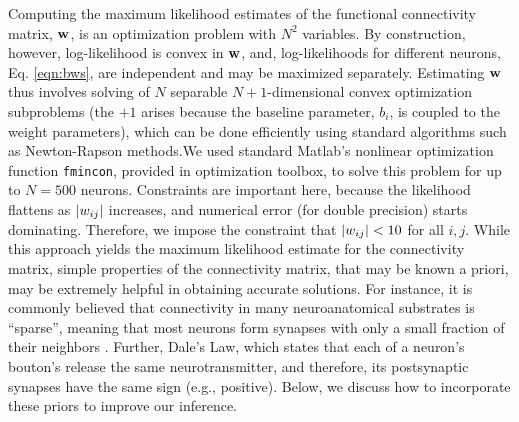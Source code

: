 


Computing the maximum likelihood estimates of the functional connectivity matrix, $\mathbf{w}$, is an optimization problem with $N^2$ variables. By construction, however, log-likelihood is convex in $\mathbf{w}$, and, log-likelihoods for different neurons, Eq. \eqref{eqn:bws}, are independent and may be maximized separately. Estimating $\mathbf{w}$ thus involves solving of $N$ separable $N+1$-dimensional convex optimization subproblems (the $+1$ arises because the baseline parameter, $b_i$, is coupled to the weight parameters), which can be done efficiently using standard algorithms such as Newton-Rapson methods.We used standard Matlab's nonlinear optimization function \texttt{fmincon}, provided in optimization toolbox, to solve this problem for up to $N=500$ neurons.  Constraints are important here, because the likelihood flattens as $|w_{ij}|$ increases, and numerical error (for double precision) starts dominating.  Therefore, we impose the constraint that $|w_{ij}|<10$ for all $i,j$. While this approach yields the maximum likelihood estimate for the connectivity matrix, simple properties of the connectivity matrix, that may be known a priori, may be extremely helpful in obtaining accurate solutions. For instance, it is commonly believed that connectivity in many neuroanatomical substrates is ``sparse'', meaning that most neurons form synapses with only a small fraction of their neighbors \cite{??}.  Further, Dale's Law, which states that each of a neuron's bouton's release the same neurotransmitter, and therefore, its postsynaptic synapses have the same sign (e.g., positive).  Below, we discuss how to incorporate these priors to improve our inference.

